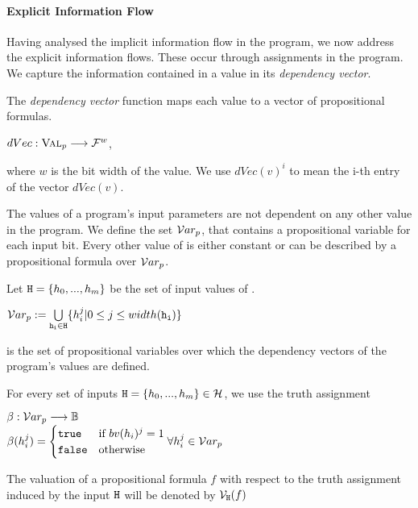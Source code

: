 \paragraph{Explicit Information Flow}
Having analysed the implicit information flow in the program, we now address the explicit information flows. These occur through assignments in the program. We capture the information contained in a value in its \emph{dependency vector}.

\begin{definition}
    The \emph{dependency vector} function maps each value to a vector of propositional formulas.
    \begin{center}
        $dVec: \textsc{Val}_p \longrightarrow \mathcal{F}^w$,
    \end{center}
    where $w$ is the bit width of the value.
    We use $dVec(v)^i$ to mean the i-th entry of the vector $dVec(v)$.
\end{definition}

The values of a program's input parameters are not dependent on any other value in the program. We define the set $\mathcal{V}ar_p$, that contains a propositional variable for each input bit. Every other value of \p is either constant or can be described by a propositional formula over $\mathcal{V}ar_p$. 

\begin{definition}
    Let $\mathtt{H} = \{ h_0, ..., h_m \}$ be the set of input values of \pp.
    \begin{center}
        $\mathcal{V}ar_p := \bigcup\limits_{\mathtt{h_i} \in \mathtt{H}} \{h_i^j | 0 \leq j \leq width(\mathtt{h_i})\}$
    \end{center}
    is the set of propositional variables over which the dependency vectors of the program's values are defined.
\end{definition}

\begin{definition}
    For every set of inputs $\mathtt{H} = \{ h_0, ..., h_m \} \in \mathcal{H}$, we use the truth assignment
    \begin{center}
        $\beta: \mathcal{V}ar_p \longrightarrow \mathbb{B}$\\
        $\beta(h_i^j) = \begin{cases}
            \mathtt{true} & \text{if }bv(h_i)^j = 1\\
            \mathtt{false} & \text{otherwise}
        \end{cases} \forall h_i^j \in \mathcal{V}ar_p$
    \end{center}
    The valuation of a propositional formula $f$ with respect to the truth assignment induced by the input $\mathtt{H}$ will be denoted by $\mathcal{V}_{\mathtt{H}} (f)$
\end{definition}

